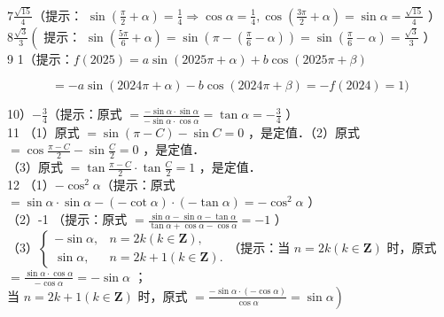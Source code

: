 \documentclass[10pt]{article}
\begin{document}
\(7 \frac{\sqrt{15}}{4}\)（提示： \(\sin \left(\frac{\pi}{2}+\alpha\right)=\frac{1}{4} \Rightarrow \cos \alpha=\frac{1}{4}, \cos \left(\frac{3 \pi}{2}+\alpha\right)=\sin \alpha=\frac{\sqrt{15}}{4}\) ）\\
\(8 \frac{\sqrt{3}}{3}\left(\right.\) 提示： \(\sin \left(\frac{5 \pi}{6}+\alpha\right)=\sin \left(\pi-\left(\frac{\pi}{6}-\alpha\right)\right)=\sin \left(\frac{\pi}{6}-\alpha\right)=\frac{\sqrt{3}}{3}\) ）\\
9 1（提示：\(f(2025)=a \sin (2025 \pi+\alpha)+b \cos (2025 \pi+\beta)\)

\[
=-a \sin (2024 \pi+\alpha)-b \cos (2024 \pi+\beta)=-f(2024)=1)
\]

10）\(-\frac{3}{4}\)（提示：原式 \(=\frac{-\sin \alpha \cdot \sin \alpha}{-\sin \alpha \cdot \cos \alpha}=\tan \alpha=-\frac{3}{4}\) ）\\
11 （1）原式 \(=\sin (\pi-C)-\sin C=0\) ，是定值．（2）原式 \(=\cos \frac{\pi-C}{2}-\sin \frac{C}{2}=0\) ，是定值．\\
（3）原式 \(=\tan \frac{\pi-C}{2} \cdot \tan \frac{C}{2}=1\) ，是定值．\\
12 （1）\(-\cos ^{2} \alpha\)（提示：原式 \(=\sin \alpha \cdot \sin \alpha-(-\cot \alpha) \cdot(-\tan \alpha)=-\cos ^{2} \alpha\) ）\\
（2）-1 （提示：原式 \(=\frac{\sin \alpha-\sin \alpha-\tan \alpha}{\tan \alpha+\cos \alpha-\cos \alpha}=-1\) ）\\
（3）\(\left\{\begin{array}{ll}-\sin \alpha, & n=2 k(k \in \mathbf{Z}), \\ \sin \alpha, & n=2 k+1(k \in \mathbf{Z}) .\end{array}\right.\)（提示：当 \(n=2 k(k \in \mathbf{Z})\) 时，原式 \(=\frac{\sin \alpha \cdot \cos \alpha}{-\cos \alpha}=-\sin \alpha\) ；\\
当 \(n=2 k+1(k \in \mathbf{Z})\) 时，原式 \(\left.=\frac{-\sin \alpha \cdot(-\cos \alpha)}{\cos \alpha}=\sin \alpha\right)\)
\end{document}
